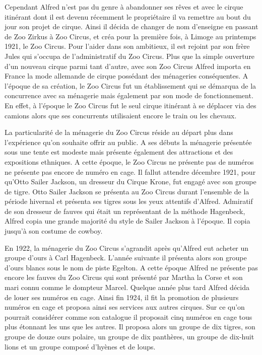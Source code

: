 Cependant Alfred n’est pas du genre à abandonner ses rêves et avec le cirque itinérant dont il est devenu récemment le propriétaire il va remettre au bout du jour son projet de cirque. Ainsi il décida de changer de nom d’enseigne en passant de Zoo Zirkus à Zoo Circus, et créa pour la première fois, à Limoge au printemps 1921, le Zoo Circus. Pour l’aider dans son ambitieux, il est rejoint par son frère Jules qui s’occupa de l’administratif du Zoo Circus. Plus que la simple ouverture d’un nouveau cirque parmi tant d’autre, avec son Zoo Circus Alfred importa en France la mode allemande de cirque possédant des ménageries conséquentes. A l’époque de sa création, le Zoo Circus fut un établissement qui se démarqua de la concurrence avec sa ménagerie mais également par son mode de fonctionnement. En effet, à l’époque le Zoo Circus fut le seul cirque itinérant à se déplacer via des camions alors que ses concurrents utilisaient encore le train ou les chevaux. 

La particularité de la ménagerie du Zoo Circus réside au départ plus dans l’expérience qu’on souhaite offrir au public. A ses débuts la ménagerie présentée sous une tente est modeste mais présente également des attractions et des expositions ethniques. A cette époque, le Zoo Circus ne présente pas de numéros ne présente pas encore de numéro en cage. Il fallut attendre décembre 1921, pour qu’Otto Sailer Jackson, un dresseur du Cirque Krone, fut engagé avec son groupe de tigre. Otto Sailer Jackson se présenta au Zoo Circus durant l’ensemble de la période hivernal et présenta ses tigres sous les yeux attentifs d’Alfred. Admiratif de son dresseur de fauves qui était un représentant de la méthode Hagenbeck, Alfred copia une grande majorité du style de Sailer Jackson à l’époque. Il copia jusqu’à son costume de cowboy.

En 1922, la ménagerie du Zoo Circus s’agrandit après qu’Alfred eut acheter un groupe d’ours à Carl Hagenbeck. L’année suivante il présenta alors son groupe d’ours blancs sous le nom de piste Egelton. A cette époque Alfred ne présente pas encore les fauves du Zoo Circus qui sont présenté par Martha la Corse et son mari connu comme le dompteur Marcel. Quelque année plus tard Alfred décida de louer ses numéros en cage. Ainsi fin 1924, il fit la promotion de plusieurs numéros en cage et proposa ainsi ses services aux autres cirques. Sur ce qu’on pourrait considérer comme son catalogue il proposait cinq numéros en cage tous plus étonnant les uns que les autres. Il proposa alors un groupe de dix tigres, son groupe de douze ours polaire, un groupe de dix panthères, un groupe de dix-huit lions et un groupe composé d’hyènes et de loups. 

